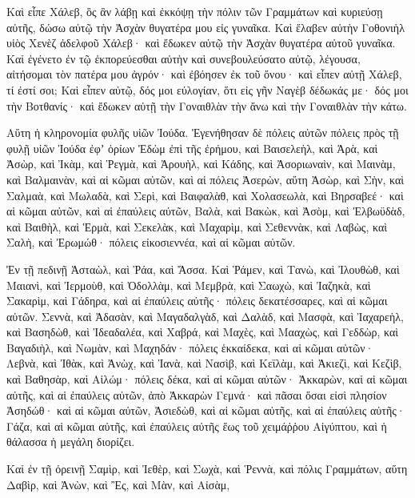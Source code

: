 {\par }{\PP {}Καὶ εἶπε Χάλεβ, ὃς ἂν λάβῃ καὶ ἐκκόψῃ τὴν πόλιν τῶν Γραμμάτων καὶ κυριεύσῃ αὐτῆς, δώσω αὐτῷ τὴν Ἀσχὰν θυγατέρα μου εἰς γυναῖκα.
Καὶ ἔλαβεν αὐτὴν Γοθονιὴλ υἱὸς Χενὲζ ἀδελφοῦ Χάλεβ· καὶ ἔδωκεν αὐτῷ τὴν Ἀσχὰν θυγατέρα αὐτοῦ γυναῖκα.
Καὶ ἐγένετο ἐν τῷ ἐκπορεύεσθαι αὐτὴν καὶ συνεβουλεύσατο αὐτῷ, λέγουσα, αἰτήσομαι τὸν πατέρα μου ἀγρόν· καὶ ἐβόησεν ἐκ τοῦ ὄνου· καὶ εἶπεν αὐτῇ Χάλεβ, τί ἐστί σοι;
Καὶ εἶπεν αὐτῷ, δός μοι εὐλογίαν, ὅτι εἰς γῆν Ναγὲβ δέδωκάς με· δός μοι τὴν Βοτθανίς· καὶ ἔδωκεν αὐτῇ τὴν Γοναιθλὰν τὴν ἄνω καὶ τὴν Γοναιθλὰν τὴν κάτω.
\par }{\PP {}Αὕτη ἡ κληρονομία φυλῆς υἱῶν Ἰούδα.
Ἐγενήθησαν δὲ πόλεις αὐτῶν πόλεις πρὸς τῇ φυλῇ υἱῶν Ἰούδα ἐφʼ ὁρίων Ἐδὼμ ἐπὶ τῆς ἐρήμου, καὶ Βαισελεὴλ, καὶ Ἀρὰ, καὶ Ἀσὼρ,
καὶ Ἰκὰμ, καὶ Ῥεγμὰ, καὶ Ἀρουὴλ,
καὶ Κάδης, καὶ Ἀσοριωναὶν, καὶ Μαινὰμ,
καὶ Βαλμαινὰν, καὶ αἱ κῶμαι αὐτῶν,
καὶ αἱ πόλεις Ἀσερὼν, αὕτη Ἀσὼρ,
καὶ Σὴν, καὶ Σαλμαὰ, καὶ Μωλαδὰ,
καὶ Σερὶ, καὶ Βαιφαλὰθ,
καὶ Χολασεωλὰ, καὶ Βηρσαβεέ· καὶ αἱ κῶμαι αὐτῶν, καὶ αἱ ἐπαύλεις αὐτῶν,
Βαλὰ, καὶ Βακὼκ, καὶ Ἀσὸμ,
καὶ Ἐλβωϋδὰδ, καὶ Βαιθὴλ, καὶ Ἑρμὰ,
καὶ Σεκελὰκ, καὶ Μαχαρὶμ, καὶ Σεθεννὰκ,
καὶ Λαβὼς, καὶ Σαλὴ, καὶ Ἐρωμώθ· πόλεις εἰκοσιεννέα, καὶ αἱ κῶμαι αὐτῶν.
\par }{\PP {}Ἐν τῇ πεδινῇ Ἀσταὼλ, καὶ Ῥάα, καὶ Ἄσσα.
Καὶ Ῥάμεν, καὶ Τανὼ, καὶ Ἰλουθὼθ, καὶ Μαιανὶ,
καὶ Ἰερμοὺθ, καὶ Ὀδολλὰμ, καὶ Μεμβρὰ, καὶ Σαωχὼ, καὶ Ἰαζηκὰ,
καὶ Σακαρὶμ, καὶ Γάδηρα, καὶ αἱ ἐπαύλεις αὐτῆς· πόλεις δεκατέσσαρες, καὶ αἱ κῶμαι αὐτῶν.
Σεννὰ, καὶ Ἀδασὰν, καὶ Μαγαδαλγὰδ,
καὶ Δαλὰδ, καὶ Μασφὰ, καὶ Ἰαχαρεὴλ,
καὶ Βασηδὼθ, καὶ Ἰδεαδαλέα, καὶ
Χαβρά, καὶ Μαχὲς, καὶ Μααχὼς,
καὶ Γεδδὼρ, καὶ Βαγαδιὴλ, καὶ Νωμὰν, καὶ Μαχηδάν· πόλεις ἑκκαίδεκα, καὶ αἱ κῶμαι αὐτῶν·
Λεβνὰ, καὶ Ἰθὰκ, καὶ Ἀνὼχ,
καὶ Ἰανὰ, καὶ Νασὶβ,
καὶ Κεϊλὰμ, καὶ Ἀκιεζὶ, καὶ Κεζὶβ, καὶ Βαθησὰρ, καὶ Αἰλώμ· πόλεις δέκα, καὶ αἱ κῶμαι αὐτῶν·
Ἀκκαρὼν, καὶ αἱ κῶμαι αὐτῆς, καὶ αἱ ἐπαύλεις αὐτῶν,
ἀπὸ Ἀκκαρὼν Γεμνά· καὶ πᾶσαι ὅσαι εἰσὶ πλησίον Ἀσηδώθ· καὶ αἱ κῶμαι αὐτῶν,
Ἀσιεδὼθ, καὶ αἱ κῶμαι αὐτῆς, καὶ αἱ ἐπαύλεις αὐτῆς· Γάζα, καὶ αἱ κῶμαι αὐτῆς, καὶ ἐπαύλεις αὐτῆς ἕως τοῦ χειμάῤῥου Αἰγύπτου, καὶ ἡ θάλασσα ἡ μεγάλη διορίζει.
\par }{\PP {}Καὶ ἐν τῇ ὀρεινῇ Σαμὶρ, καὶ Ἰεθὲρ, καὶ Σωχὰ,
καὶ Ῥεννὰ, καὶ πόλις Γραμμάτων, αὕτη Δαβὶρ,
καὶ Ἀνὼν, καὶ Ἒς, καὶ Μὰν, καὶ Αἰσὰμ,
}
